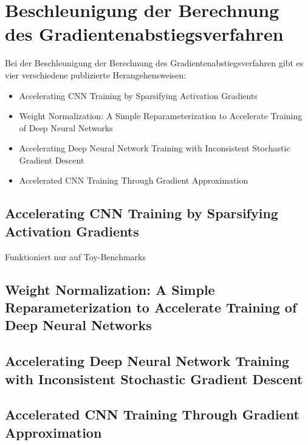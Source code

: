 \chapter{Beschleunigung der Berechnung des Gradientenabstiegsverfahren}
Bei der Beschleunigung der Berechnung des Gradientenabstiegsverfahren gibt es vier verschiedene publizierte Herangehensweisen:
\begin{itemize}
 \item Accelerating CNN Training by Sparsifying Activation Gradients
 \item Weight Normalization: A Simple Reparameterization
to Accelerate Training of Deep Neural Networks
 \item Accelerating Deep Neural Network Training with Inconsistent Stochastic Gradient Descent
 \item Accelerated CNN Training Through Gradient Approximation 
\end{itemize}


\section{Accelerating CNN Training by Sparsifying Activation Gradients}

Funktioniert nur auf Toy-Benchmarks


\section{Weight Normalization: A Simple Reparameterization
to Accelerate Training of Deep Neural Networks}



\section{Accelerating Deep Neural Network Training with Inconsistent Stochastic Gradient Descent}


\section{Accelerated CNN Training Through Gradient Approximation }
